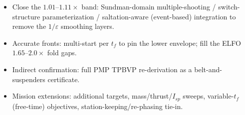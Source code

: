 \documentclass[11pt]{article}
\begin{document}
\begin{itemize}
  \item Close the $1.01$--$1.11\times$ band: Sundman-domain multiple-shooting /
        switch-structure parameterization / saltation-aware (event-based)
        integration to remove the $1/\varepsilon$ smoothing layers.
  \item Accurate fronts: multi-start per $t_f$ to pin the lower envelope; fill
        the ELFO $1.65$--$2.0\times$ fold gaps.
  \item Indirect confirmation: full PMP TPBVP re-derivation as a
        belt-and-suspenders certificate.
  \item Mission extensions: additional targets, mass/thrust/$I_{sp}$ sweeps,
        variable-$t_f$ (free-time) objectives, station-keeping/re-phasing tie-in.
\end{itemize}
\end{document}

